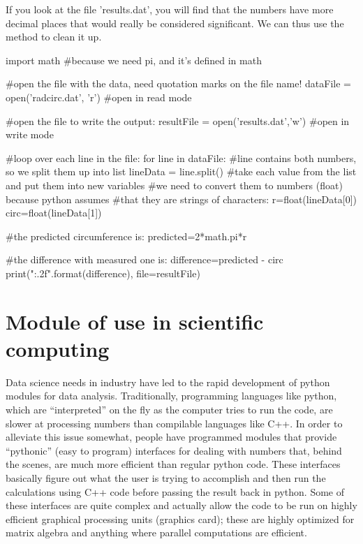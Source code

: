 If you look at the file 'results.dat', you will find that the numbers have more decimal places that would really be considered significant. We can thus use the  method to clean it up.

\begin{python}[caption = \mbox{}]
import math #because we need pi, and it's defined in math

#open the file with the data, need quotation marks on the file name!
dataFile = open('radcirc.dat', 'r') #open in read mode

#open the file to write the output:
resultFile = open('results.dat','w') #open in write mode

#loop over each line in the file:
for line in dataFile:
  #line contains both numbers, so we split them up into list
  lineData = line.split()
  #take each value from the list and put them into new variables
  #we need to convert them to numbers (float) because python assumes
  #that they are strings of characters:
  r=float(lineData[0])
  circ=float(lineData[1])
  
  #the predicted circumference is:
  predicted=2*math.pi*r
  
  #the difference with measured one is:
  difference=predicted - circ
  print("{:.2f}".format(difference), file=resultFile)

\end{python}


\section{Module of use in scientific computing}

Data science needs in industry have led to the rapid development of python modules for data analysis. Traditionally, programming languages like python, which are ``interpreted'' on the fly as the computer tries to run the code, are slower at processing numbers than compilable languages like C++. In order to alleviate this issue somewhat, people have programmed modules that provide ``pythonic'' (easy to program) interfaces for dealing with numbers that, behind the scenes, are much more efficient than regular python code. These interfaces basically figure out what the user is trying to accomplish and then run the calculations using C++ code before passing the result back in python. Some of these interfaces are quite complex and actually allow the code to be run on highly efficient graphical processing units (graphics card); these are highly optimized for matrix algebra and anything where parallel computations are efficient.

